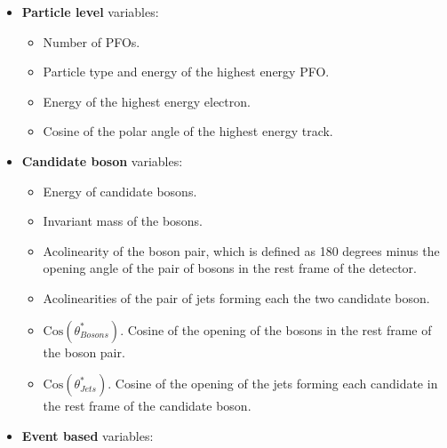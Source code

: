 \begin{itemize}
\item \textbf{Particle level} variables:

\begin{itemize}
\item Number of PFOs.
\item Particle type and energy of the highest energy PFO.
\item Energy of the highest energy electron.
\item Cosine of the polar angle of the highest energy track.
\end{itemize}

\item \textbf{Candidate boson} variables:

\begin{itemize}
\item Energy of candidate bosons.
\item Invariant mass of the bosons.
\item Acolinearity of the boson pair, which is defined as 180 degrees minus the opening angle of the pair of bosons in the rest frame of the detector.
\item Acolinearities of the pair of jets forming each the two candidate boson.
\item $\text{Cos}(\theta^{*}_{Bosons})$.  Cosine of the opening of the bosons in the rest frame of the boson pair.
\item $\text{Cos}(\theta^{*}_{Jets})$.  Cosine of the opening of the jets forming each candidate in the rest frame of the candidate boson.
\end{itemize}

\item \textbf{Event based} variables:  


\end{itemize}
